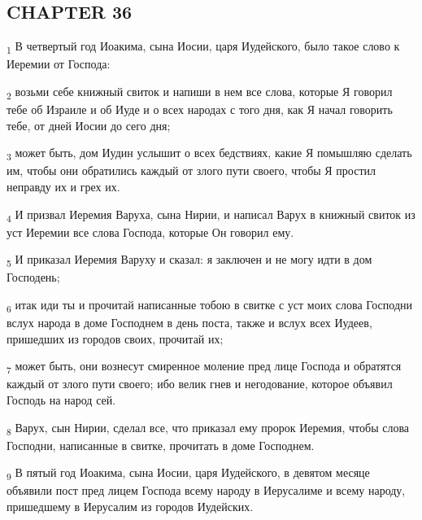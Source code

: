 \subsection{CHAPTER 36}
\begin{tcolorbox}
\textsubscript{1} В четвертый год Иоакима, сына Иосии, царя Иудейского, было такое слово к Иеремии от Господа:
\end{tcolorbox}
\begin{tcolorbox}
\textsubscript{2} возьми себе книжный свиток и напиши в нем все слова, которые Я говорил тебе об Израиле и об Иуде и о всех народах с того дня, как Я начал говорить тебе, от дней Иосии до сего дня;
\end{tcolorbox}
\begin{tcolorbox}
\textsubscript{3} может быть, дом Иудин услышит о всех бедствиях, какие Я помышляю сделать им, чтобы они обратились каждый от злого пути своего, чтобы Я простил неправду их и грех их.
\end{tcolorbox}
\begin{tcolorbox}
\textsubscript{4} И призвал Иеремия Варуха, сына Нирии, и написал Варух в книжный свиток из уст Иеремии все слова Господа, которые Он говорил ему.
\end{tcolorbox}
\begin{tcolorbox}
\textsubscript{5} И приказал Иеремия Варуху и сказал: я заключен и не могу идти в дом Господень;
\end{tcolorbox}
\begin{tcolorbox}
\textsubscript{6} итак иди ты и прочитай написанные тобою в свитке с уст моих слова Господни вслух народа в доме Господнем в день поста, также и вслух всех Иудеев, пришедших из городов своих, прочитай их;
\end{tcolorbox}
\begin{tcolorbox}
\textsubscript{7} может быть, они вознесут смиренное моление пред лице Господа и обратятся каждый от злого пути своего; ибо велик гнев и негодование, которое объявил Господь на народ сей.
\end{tcolorbox}
\begin{tcolorbox}
\textsubscript{8} Варух, сын Нирии, сделал все, что приказал ему пророк Иеремия, чтобы слова Господни, написанные в свитке, прочитать в доме Господнем.
\end{tcolorbox}
\begin{tcolorbox}
\textsubscript{9} В пятый год Иоакима, сына Иосии, царя Иудейского, в девятом месяце объявили пост пред лицем Господа всему народу в Иерусалиме и всему народу, пришедшему в Иерусалим из городов Иудейских.
\end{tcolorbox}
